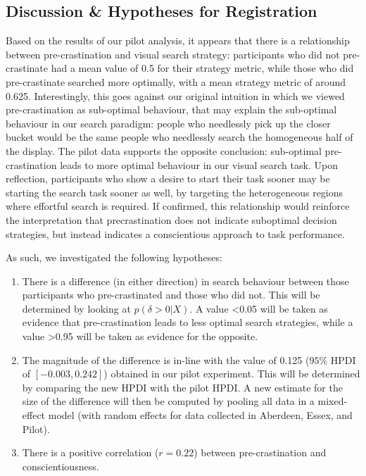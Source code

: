 \documentclass[]{rsos}
\begin{document}
\subsection{Discussion \& Hypotheses for Registration}

Based on the results of our pilot analysis, it appears that there is a relationship between pre-crastination and visual search strategy: participants who did not pre-crastinate had a mean value of 0.5 for their strategy metric, while those who did pre-crastinate searched more optimally, with a mean strategy metric of around 0.625. Interestingly, this goes against our original intuition in which we viewed pre-crastination as sub-optimal behaviour, that may explain the sub-optimal behaviour in our search paradigm: people who needlessly pick up the closer bucket would be the same people who needlessly search the homogeneous half of the display. The pilot data supports the opposite conclusion: sub-optimal pre-crastination leads to more optimal behaviour in our visual search task. Upon reflection, participants who show a desire to start their task sooner may be starting the search task sooner as well, by targeting the heterogeneous regions where effortful search is required. If confirmed, this relationship would reinforce the interpretation that precrastination does not indicate suboptimal decision strategies, but instead indicates a conscientious approach to task performance.

As such, we investigated the following hypotheses:

\begin{enumerate}
\item There is a difference (in either direction) in search behaviour between those participants who pre-crastinated and those who did not. This will be determined by looking at $p(\delta>0 | X)$. A value <0.05 will be taken as evidence that pre-crastination leads to less optimal search strategies, while a value >0.95 will be taken as evidence for the opposite.
\item The magnitude of the difference is in-line with the value of 0.125 ($95\%$ HPDI of $[-0.003, 0.242]$) obtained in our pilot experiment. This will be determined by comparing the new HPDI with the pilot HPDI. A new estimate for the size of the difference will then be computed by pooling all data in a mixed-effect model (with random effects for data collected in Aberdeen, Essex, and Pilot).
\item There is a positive correlation ($r=0.22$) between pre-crastination and conscientiousness.
\end{enumerate}
\end{document}
